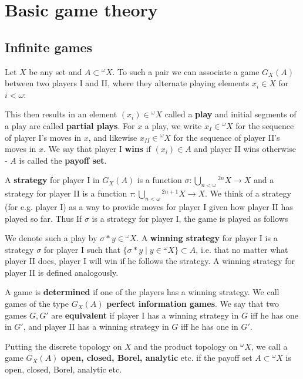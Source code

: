 \chapter{Basic game theory}
\thispagestyle{fancy}
\label{ch1}

\section{Infinite games}
Let $X$ be any set and $A\subset{^\omega X}$. To such a pair we can associate a game $G_X(A)$ between two players I and II, where they alternate playing elements $x_i\in X$ for $i<\omega$:

\qquad This then results in an element $(x_i)\in{^\omega X}$ called a \textbf{play} and initial segments of a play are called \textbf{partial plays}. For $x$ a play, we write $x_I\in{^\omega X}$ for the sequence of player I's moves in $x$, and likewise $x_{II}\in{^\omega X}$ for the sequence of player II's moves in $x$. We say that player I \textbf{wins} if $(x_i)\in A$ and player II wins otherwise - $A$ is called the \textbf{payoff set}.

\qquad A \textbf{strategy} for player I in $G_X(A)$ is a function $\sigma:\bigcup_{n<\omega}{^{2n}X}\to X$ and a strategy for player II is a function $\tau:\bigcup_{n<\omega}{^{2n+1}X}\to X$. We think of a strategy (for e.g. player I) as a way to provide moves for player I given how player II has played so far. Thus If $\sigma$ is a strategy for player I, the game is played as follows

\qquad We denote such a play by $\sigma*y\in {^\omega X}$. A \textbf{winning strategy} for player I is a strategy $\sigma$ for player I such that $\{\sigma*y\mid y\in{^\omega X}\}\subset A$, i.e. that no matter what player II does, player I will win if he follows the strategy. A winning strategy for player II is defined analogously.

\qquad A game is \textbf{determined} if one of the players has a winning strategy. We call games of the type $G_X(A)$ \textbf{perfect information games}. We say that two games $G,G'$ are \textbf{equivalent} if player I has a winning strategy in $G$ iff he has one in $G'$, and player II has a winning strategy in $G$ iff he has one in $G'$.

\qquad Putting the discrete topology on $X$ and the product topology on ${^\omega X}$, we call a game $G_X(A)$ \textbf{open, closed, Borel, analytic} etc. if the payoff set $A\subset {^\omega X}$ is open, closed, Borel, analytic etc.

